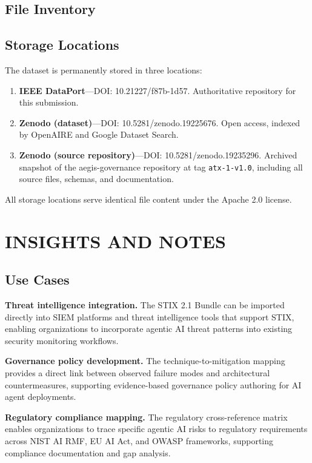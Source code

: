 \documentclass{IEEEoj-data}
\begin{document}
\subsection*{File Inventory}

\subsection*{Storage Locations}

The dataset is permanently stored in three locations:

\begin{enumerate}
\item {\bf IEEE DataPort}---DOI: 10.21227/f87b-1d57. Authoritative repository for this submission.
\item {\bf Zenodo (dataset)}---DOI: 10.5281/zenodo.19225676. Open access, indexed by OpenAIRE and Google Dataset Search.
\item {\bf Zenodo (source repository)}---DOI: 10.5281/zenodo.19235296. Archived snapshot of the aegis-governance repository at tag \texttt{atx-1-v1.0}, including all source files, schemas, and documentation.
\end{enumerate}

All storage locations serve identical file content under the Apache 2.0 license.


\section*{INSIGHTS AND NOTES}

\subsection*{Use Cases}

{\bf Threat intelligence integration.} The STIX 2.1 Bundle can be imported directly into SIEM platforms and threat intelligence tools that support STIX, enabling organizations to incorporate agentic AI threat patterns into existing security monitoring workflows.

{\bf Governance policy development.} The technique-to-mitigation mapping provides a direct link between observed failure modes and architectural countermeasures, supporting evidence-based governance policy authoring for AI agent deployments.

{\bf Regulatory compliance mapping.} The regulatory cross-reference matrix enables organizations to trace specific agentic AI risks to regulatory requirements across NIST AI RMF, EU AI Act, and OWASP frameworks, supporting compliance documentation and gap analysis.
\end{document}
